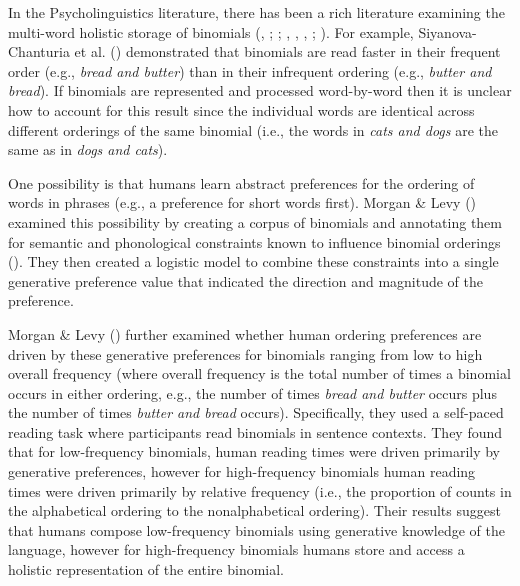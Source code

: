 \documentclass[
  12pt,
]{scrartcl}
\begin{document}
In the Psycholinguistics literature, there has been a rich literature
examining the multi-word holistic storage of binomials
(,
;
; , ,
,
;
). For example, Siyanova-Chanturia et al.
()
demonstrated that binomials are read faster in their frequent order
(e.g., \emph{bread and butter}) than in their infrequent ordering (e.g.,
\emph{butter and bread}). If binomials are represented and processed
word-by-word then it is unclear how to account for this result since the
individual words are identical across different orderings of the same
binomial (i.e., the words in \emph{cats and dogs} are the same as in
\emph{dogs and cats}).

One possibility is that humans learn abstract preferences for the
ordering of words in phrases (e.g., a preference for short words first).
Morgan \& Levy ()
examined this possibility by creating a corpus of binomials and
annotating them for semantic and phonological constraints known to
influence binomial orderings
().
They then created a logistic model to combine these constraints into a
single generative preference value that indicated the direction and
magnitude of the preference.

Morgan \& Levy ()
further examined whether human ordering preferences are driven by these
generative preferences for binomials ranging from low to high overall
frequency (where overall frequency is the total number of times a
binomial occurs in either ordering, e.g., the number of times
\emph{bread and butter} occurs plus the number of times \emph{butter and
bread} occurs). Specifically, they used a self-paced reading task where
participants read binomials in sentence contexts. They found that for
low-frequency binomials, human reading times were driven primarily by
generative preferences, however for high-frequency binomials human
reading times were driven primarily by relative frequency (i.e., the
proportion of counts in the alphabetical ordering to the nonalphabetical
ordering). Their results suggest that humans compose low-frequency
binomials using generative knowledge of the language, however for
high-frequency binomials humans store and access a holistic
representation of the entire binomial.
\end{document}
